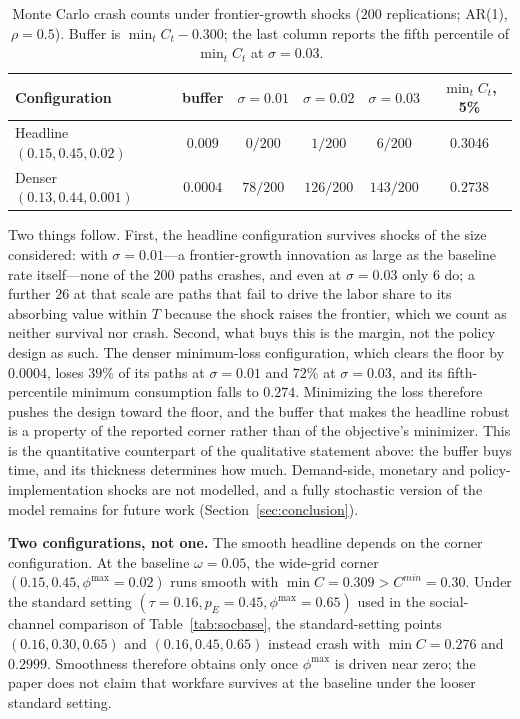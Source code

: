 \documentclass[review,12pt]{elsarticle}
\theoremstyle{plain}
\theoremstyle{definition}
\theoremstyle{remark}
\begin{document}
\begin{table}[h]
\centering\small
\caption{Monte Carlo crash counts under frontier-growth shocks ($200$ replications; AR(1), $\rho=0.5$). Buffer is $\min_tC_t-0.300$; the last column reports the fifth percentile of $\min_tC_t$ at $\sigma=0.03$.}\label{tab:shock}
\begin{tabular}{@{}lccccc@{}}
\toprule
Configuration & buffer & $\sigma{=}0.01$ & $\sigma{=}0.02$ & $\sigma{=}0.03$ & $\min_tC_t$, 5\% \\
\midrule
Headline $(0.15,0.45,0.02)$ & $0.009$ & $0/200$ & $1/200$ & $6/200$ & $0.3046$ \\
Denser $(0.13,0.44,0.001)$ & $0.0004$ & $78/200$ & $126/200$ & $143/200$ & $0.2738$ \\
\bottomrule
\end{tabular}
\end{table}

Two things follow. First, the headline configuration survives shocks of the size considered: with $\sigma=0.01$---a frontier-growth innovation as large as the baseline rate itself---none of the $200$ paths crashes, and even at $\sigma=0.03$ only $6$ do; a further $26$ at that scale are paths that fail to drive the labor share to its absorbing value within $T$ because the shock raises the frontier, which we count as neither survival nor crash. Second, what buys this is the margin, not the policy design as such. The denser minimum-loss configuration, which clears the floor by $0.0004$, loses $39\%$ of its paths at $\sigma=0.01$ and $72\%$ at $\sigma=0.03$, and its fifth-percentile minimum consumption falls to $0.274$. Minimizing the loss therefore pushes the design toward the floor, and the buffer that makes the headline robust is a property of the reported corner rather than of the objective's minimizer. This is the quantitative counterpart of the qualitative statement above: the buffer buys time, and its thickness determines how much. Demand-side, monetary and policy-implementation shocks are not modelled, and a fully stochastic version of the model remains for future work (Section~\ref{sec:conclusion}).

\smallskip\noindent\textbf{Two configurations, not one.} The smooth headline depends on the corner configuration. At the baseline $\omega=0.05$, the wide-grid corner $(0.15,0.45,\phi^{\max}=0.02)$ runs smooth with $\min C=0.309>C^{min}=0.30$. Under the standard setting $(\tau=0.16,p_E=0.45,\phi^{\max}=0.65)$ used in the social-channel comparison of Table~\ref{tab:socbase}, the standard-setting points $(0.16,0.30,0.65)$ and $(0.16,0.45,0.65)$ instead crash with $\min C=0.276$ and $0.2999$. Smoothness therefore obtains only once $\phi^{\max}$ is driven near zero; the paper does not claim that workfare survives at the baseline under the looser standard setting.
\end{document}
